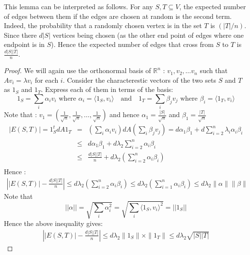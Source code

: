 \begin{remark}
This lemma can be interpreted as follows. For any $S,T \subseteq V$, the expected number of edges between them if the edges are chosen at random is the second term. Indeed, the probability that a randomly chosen vertex is in the set $T$ is $(|T|/n)$. Since there $d|S|$ vertices being chosen (as the other end point of edges where one endpoint is in $S$). Hence the expected number of edges that cross from $S$ to $T$ is $\frac{d|S||T|}{n}$.
\end{remark}

\begin{proof}
We will again use the orthonormal basis of $\mathbb{R}^n$ : $v_1,v_2, \ldots v_n$ such that $Av_i = \lambda v_i$ for each $i$. Consider the characterestic vectors of the two sets $S$ and $T$ as $1_S$ and $1_T$. Express each of them in terms of the basis:
\[1_S = \sum_i \alpha_i v_i \textrm{ where } 
\alpha_i = \langle 1_S, v_i \rangle
\textrm{~~ and ~~} 1_T = \sum_i \beta_j v_j \textrm{ where } \beta_i = \langle 1_T, v_i \rangle
\]
Note that :  $v_1 = (\frac{1}{\sqrt{n}},\frac{1}{\sqrt{n}},\ldots,\frac{1}{\sqrt{n}})$ and hence 
$\alpha_1 = \frac{|S|}{\sqrt{n}}$ and 
$\beta_1 = \frac{|T|}{\sqrt{n}}$
\begin{eqnarray*}
|E(S,T)| = 1_S^tdA1_T & = & \left( \sum_i \alpha_i v_i \right) dA \left( \sum_i \beta_j v_j \right) = 
d\alpha_1\beta_1 + d\sum_{i=2}^n \lambda_i \alpha_i \beta_i \\
& \le &
d\alpha_1\beta_1 + d\lambda_2 \sum_{i=2}^n \alpha_i \beta_i \\ 
& \le &
\frac{d|S||T|}{n} + d\lambda_2 \left(\sum_{i=2}^n \alpha_i \beta_i \right)\\
\end{eqnarray*}
Hence : 
\begin{eqnarray*}
\left||E(S,T)| - \frac{d|S||T|}{n}\right| \le d\lambda_2 \left(\sum_{i=2}^n \alpha_i \beta_i \right) \le d\lambda_2 \left(\sum_{i=1}^n \alpha_i \beta_i \right) 
\le d\lambda_2\|\alpha\|\|\beta\|
\end{eqnarray*}
Note that $$||\alpha|| = \sqrt{\sum_i \alpha_i^2} = \sqrt{\sum_i \langle 1_S, v_i \rangle^2} = ||1_S||$$
Hence the above inequality gives:
\begin{eqnarray*}
\left||E(S,T)| - \frac{d|S||T|}{n}\right| \le d\lambda_2 \|1_S\|\times\|1_T\| \le d\lambda_2\sqrt{|S||T|}
\end{eqnarray*}
\end{proof}

